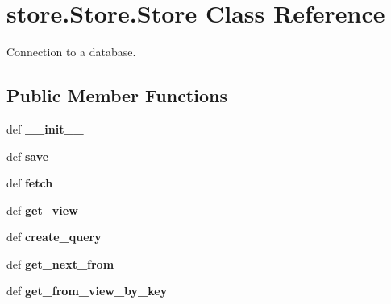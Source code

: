 \hypertarget{classstore_1_1_store_1_1_store}{\section{store.\-Store.\-Store Class Reference}
\label{classstore_1_1_store_1_1_store}
}


Connection to a database.  


\subsection*{Public Member Functions}
\begin{DoxyCompactItemize}
\item 
\hypertarget{classstore_1_1_store_1_1_store_a21565b59a0c892d657e4c5ab97f43892}{def {\bfseries \-\_\-\-\_\-init\-\_\-\-\_\-}}\label{classstore_1_1_store_1_1_store_a21565b59a0c892d657e4c5ab97f43892}

\item 
\hypertarget{classstore_1_1_store_1_1_store_a47778a74e5abeee4a86908e36b90d1d7}{def {\bfseries save}}\label{classstore_1_1_store_1_1_store_a47778a74e5abeee4a86908e36b90d1d7}

\item 
\hypertarget{classstore_1_1_store_1_1_store_a7dc8b91e7ea924a40bdd365250f5ea9b}{def {\bfseries fetch}}\label{classstore_1_1_store_1_1_store_a7dc8b91e7ea924a40bdd365250f5ea9b}

\item 
\hypertarget{classstore_1_1_store_1_1_store_a1c7da2bf4b40d323a87a30dd9b411538}{def {\bfseries get\-\_\-view}}\label{classstore_1_1_store_1_1_store_a1c7da2bf4b40d323a87a30dd9b411538}

\item 
\hypertarget{classstore_1_1_store_1_1_store_adb1f306e34efdbcdae8e7117857130a6}{def {\bfseries create\-\_\-query}}\label{classstore_1_1_store_1_1_store_adb1f306e34efdbcdae8e7117857130a6}

\item 
\hypertarget{classstore_1_1_store_1_1_store_afba7f6f0f748607ea00cd2e5fbca069e}{def {\bfseries get\-\_\-next\-\_\-from}}\label{classstore_1_1_store_1_1_store_afba7f6f0f748607ea00cd2e5fbca069e}

\item 
\hypertarget{classstore_1_1_store_1_1_store_aa1efc87dc9f6613bc3b390d65ed4a7bd}{def {\bfseries get\-\_\-from\-\_\-view\-\_\-by\-\_\-key}}\label{classstore_1_1_store_1_1_store_aa1efc87dc9f6613bc3b390d65ed4a7bd}

\end{DoxyCompactItemize}
